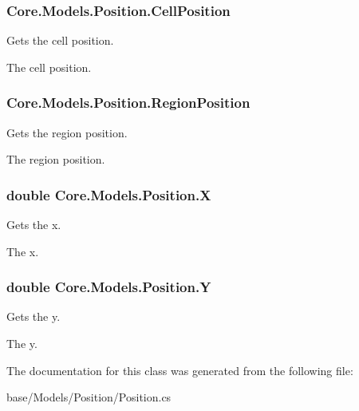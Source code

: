 \subsubsection[{Cell\+Position}]{ Core.\+Models.\+Position.\+Cell\+Position\hspace{0.3cm}{\ttfamily [get]}}\label{classCore_1_1Models_1_1Position_afee231a72dbd2f57329e2bdd2fbc25bb}


Gets the cell position. 

The cell position.\hypertarget{classCore_1_1Models_1_1Position_a7b92c9b041328e5f660f1a9f137249c6}{}
\subsubsection[{Region\+Position}]{ Core.\+Models.\+Position.\+Region\+Position\hspace{0.3cm}{\ttfamily [get]}}\label{classCore_1_1Models_1_1Position_a7b92c9b041328e5f660f1a9f137249c6}


Gets the region position. 

The region position.\hypertarget{classCore_1_1Models_1_1Position_a60f236378b77fb83a9b51d92c5d4359f}{}
\subsubsection[{X}]{\setlength{\rightskip}{0pt plus 5cm}double Core.\+Models.\+Position.\+X\hspace{0.3cm}{\ttfamily [get]}}\label{classCore_1_1Models_1_1Position_a60f236378b77fb83a9b51d92c5d4359f}


Gets the x. 

The x.\hypertarget{classCore_1_1Models_1_1Position_a795b40cbfc260e222c319cd50b5ab78c}{}
\subsubsection[{Y}]{\setlength{\rightskip}{0pt plus 5cm}double Core.\+Models.\+Position.\+Y\hspace{0.3cm}{\ttfamily [get]}}\label{classCore_1_1Models_1_1Position_a795b40cbfc260e222c319cd50b5ab78c}


Gets the y. 

The y.

The documentation for this class was generated from the following file\+:\begin{DoxyCompactItemize}
\item 
base/\+Models/\+Position/Position.\+cs\end{DoxyCompactItemize}
